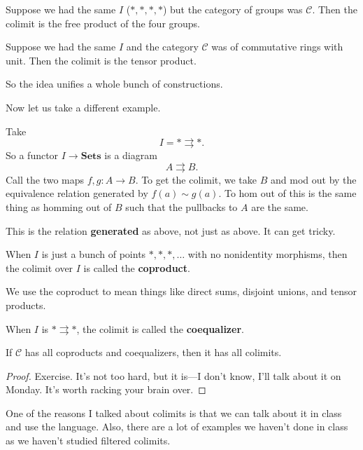 \begin{example} Suppose we had the same $I$ ($\ast, \ast, \ast, \ast$) but the
category of groups was $\mathcal{C}$. Then the colimit is the free product of
the four groups. \end{example}

\begin{example} Suppose we had the same $I$ and the category $\mathcal{C}$ was
of commutative rings with unit. Then the colimit is the tensor product.
\end{example}

So the idea unifies a whole bunch of constructions.

Now let us take a different example.

\begin{example} Take \[ I = \ast \rightrightarrows \ast. \] So a functor $I
\to \mathbf{Sets}$ is a diagram \[ A \rightrightarrows B. \] Call the two maps
$f,g: A \to B$. To get the colimit, we take $B$ and mod out by the equivalence
relation generated by $f(a) \sim g(a)$. To hom out of this is the same thing
as homming out of $B$ such that the pullbacks to $A$ are the same.

This is the relation \textbf{generated} as above, not just as above. It can
get tricky. \end{example}

\begin{definition} When $I$ is just a bunch of points $\ast, \ast, \ast,
\dots$ with no nonidentity morphisms, then the colimit over $I$ is called the
\textbf{coproduct}. \end{definition}

We use the coproduct to mean things like direct sums, disjoint unions, and
tensor products.

\begin{definition} When $I$ is $\ast \rightrightarrows \ast$, the colimit is
called the \textbf{coequalizer}. \end{definition}

\begin{theorem} If $\mathcal{C}$ has all coproducts and coequalizers, then it
has all colimits. \end{theorem}

\begin{proof} Exercise. It's not too hard, but it is---I don't know, I'll talk
about it on Monday. It's worth racking your brain over. \end{proof}

One of the reasons I talked about colimits is that we can talk about it in
class and use the language. Also, there are a lot of examples we haven't done
in class as we haven't studied filtered colimits.

